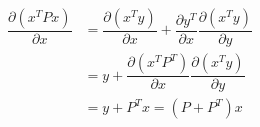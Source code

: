 \message{ !name(ass1_ChangLi.tex)}\documentclass[10pt,a4paper]{article}
\begin{document}
\begin{align*}
\dfrac{\partial (x^TPx)}{\partial x} &= \dfrac{\partial (x^Ty)}{\partial x} +  \dfrac{\partial y^T}{\partial x} \dfrac{\partial (x^Ty)}{\partial y} \\
&= y + \dfrac{\partial (x^TP^T)}{\partial x} \dfrac{\partial (x^Ty)}{\partial y} \\
&= y + P^Tx = (P+P^T)x
\end{align*}
\end{document}
